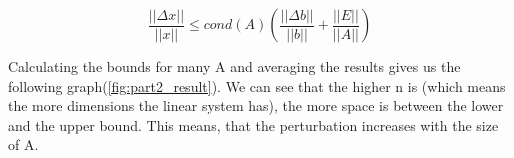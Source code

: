 \documentclass{article}
\begin{document}
\begin{equation}
    \frac{||\Delta x||}{||x||} \leq cond(A) (\frac{||\Delta b||}{||b||} + \frac{||E||}{||A||})
\end{equation}

\par\noindent
Calculating the bounds for many A and averaging the results gives us the following graph(\ref{fig:part2_result}).
We can see that the higher n is (which means the more dimensions the linear system has), the more space is between the lower and the upper bound.
This means, that the perturbation increases with the size of A.
\end{document}
